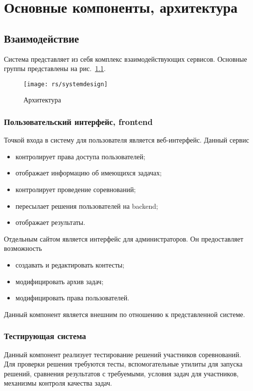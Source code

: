 \chapter{Основные компоненты, архитектура}

\section{Взаимодействие}
Система представляет из себя комплекс взаимодействующих сервисов.
Основные группы представлены на рис.~\ref{fig:systemdesign}.

\begin{figure}
    \centering
    \texttt{[image: rs/systemdesign]}
    \caption{Архитектура}
    \label{fig:systemdesign}
\end{figure}

\subsection{Пользовательский интерфейс, frontend}
Точкой входа в систему для пользователя является веб-интерфейс.
Данный сервис 
\begin{itemize}
    \item контролирует права доступа пользователей;
    \item отображает информацию об имеющихся задачах;
    \item контролирует проведение соревнований;
    \item пересылает решения пользователей на backend;
    \item отображает результаты.
\end{itemize}

Отдельным сайтом является интерфейс для администраторов.
Он предоставляет возможность
\begin{itemize}
    \item создавать и редактировать контесты;
    \item модифицировать архив задач;
    \item модифицировать права пользователей.
\end{itemize}

Данный компонент является внешним по отношению к представленной системе.

\subsection{Тестирующая система}
Данный компонент реализует тестирование решений участников соревнований.
Для проверки решения требуются тесты, вспомогательные утилиты для запуска решений,
сравнения результатов с требуемыми, условия задач для участников,
механизмы контроля качества задач.

